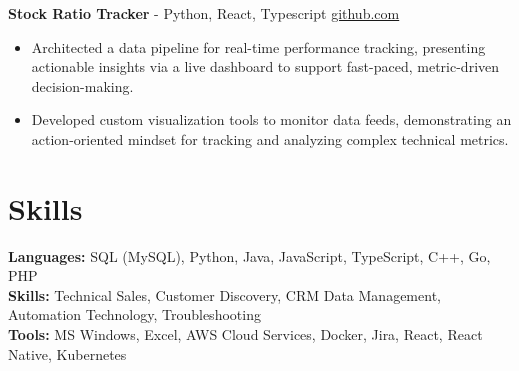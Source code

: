 \documentclass[11pt]{article}       %
\begin{document}
\textbf{Stock Ratio Tracker}{ - Python, React, Typescript} \hfill \href{https://github.com/Monica20030707/tradingDashboard-UI}{github.com} \\
\vspace{-9pt}
\begin{itemize}
  \item Architected a data pipeline for real-time performance tracking, presenting actionable insights via a live dashboard to support fast-paced, metric-driven decision-making.
  \item Developed custom visualization tools to monitor data feeds, demonstrating an action-oriented mindset for tracking and analyzing complex technical metrics.
\end{itemize}

\vspace{-18.5pt}

\section*{Skills}
\textbf{Languages:} SQL (MySQL), Python, Java, JavaScript, TypeScript, C++, Go, PHP\\
\textbf{Skills:} Technical Sales, Customer Discovery, CRM Data Management, Automation Technology, Troubleshooting\\
\textbf{Tools:} MS Windows, Excel, AWS Cloud Services, Docker, Jira, React, React Native, Kubernetes\\

\vspace{-6.5pt}
\end{document}
